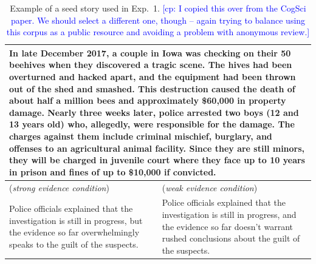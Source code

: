 \documentclass[11pt,a4paper]{article}
\newcommand{\cp}[1]{\textcolor{Blue}{[cp: #1]}}
\begin{document}
\begin{table}
\centering
\begin{tabular}{p{} p{}}
  \toprule
  \multicolumn{2}{p{0.925\textwidth}}{In late December 2017, a couple in Iowa was checking on their 50 beehives when they discovered a tragic scene. The hives had been overturned and hacked apart, and the equipment had been thrown out of the shed and smashed. This destruction caused the death of about half a million bees and approximately \$60,000 in property damage. Nearly three weeks later, police arrested two boys (12 and 13 years old) who, allegedly, were responsible for the damage. The charges against them include criminal mischief, burglary, and offenses to an agricultural animal facility. Since they are still minors, they will be charged in juvenile court where they face up to 10 years in prison and fines of up to \$10,000 if convicted.}\\ 
  \midrule
  (\emph{strong evidence condition}) & (\emph{weak evidence condition})  \\
  Police officials explained that the investigation is still in progress, but the evidence so far overwhelmingly speaks to the guilt of the suspects.  & Police officials explained that the investigation is still in progress, and the evidence so far doesn't warrant rushed conclusions about the guilt of the suspects. \\ 
  \bottomrule
\end{tabular}
\caption{Example of a seed story used in Exp.~1. \cp{I copied this over from the CogSci paper. We should select a different one, though -- again trying to balance using this corpus as a public resource and avoiding a problem with anonymous review.}}
\label{tab:examplestory}
\end{table}


\end{document}
